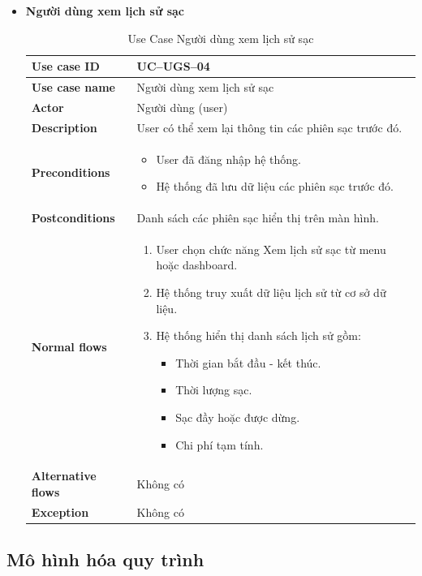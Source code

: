 \begin{itemize}
\item \textbf{Người dùng xem lịch sử sạc}
\begin{longtable}{|m{}|m{}|}
          \caption{Use Case Người dùng xem lịch sử sạc} \\
  \hline
  \textbf{Use case ID} & UC--UGS--04 \\
  \hline
  \textbf{Use case name} & Người dùng xem lịch sử sạc \\
  \hline
  \textbf{Actor} & Người dùng (user) \\
  \hline
  \textbf{Description} & User có thể xem lại thông tin các phiên sạc trước đó. \\
  \hline
  \textbf{Preconditions} &
  \begin{itemize}
    \item User đã đăng nhập hệ thống.
    \item Hệ thống đã lưu dữ liệu các phiên sạc trước đó.
  \end{itemize}\\
  \hline
  \textbf{Postconditions} & Danh sách các phiên sạc hiển thị trên màn hình. \\
  \hline
  \textbf{Normal flows} &
  \begin{enumerate}[label=\arabic*.]
    \item User chọn chức năng Xem lịch sử sạc từ menu hoặc dashboard.
    \item Hệ thống truy xuất dữ liệu lịch sử từ cơ sở dữ liệu.
    \item Hệ thống hiển thị danh sách lịch sử gồm:
      \begin{itemize}
        \item Thời gian bắt đầu - kết thúc.
        \item Thời lượng sạc.
        \item Sạc đầy hoặc được dừng.
        \item Chi phí tạm tính.
      \end{itemize}
  \end{enumerate}\\
  \hline
  \textbf{Alternative flows} & Không có\\
  \hline
  \textbf{Exception} & Không có\\
  \hline
  \end{longtable}
\end{itemize}
\subsection{Mô hình hóa quy trình}
